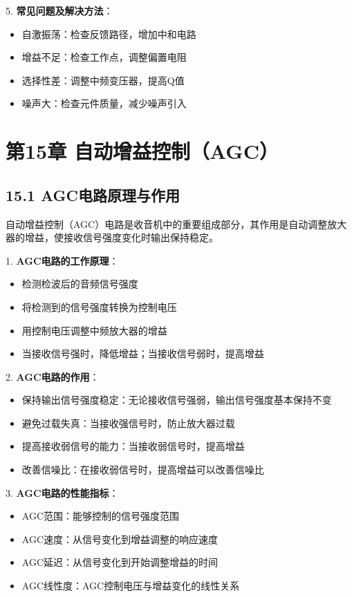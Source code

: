\documentclass[12pt,UTF8]{ctexbook}
\begin{document}
5. \textbf{常见问题及解决方法}：
   \begin{itemize}[leftmargin=3.5em]
   \item 自激振荡：检查反馈路径，增加中和电路
   \item 增益不足：检查工作点，调整偏置电阻
   \item 选择性差：调整中频变压器，提高Q值
   \item 噪声大：检查元件质量，减少噪声引入
   \end{itemize}

\chapter*{第15章 自动增益控制（AGC）}
\section*{15.1 AGC电路原理与作用}

自动增益控制（AGC）电路是收音机中的重要组成部分，其作用是自动调整放大器的增益，使接收信号强度变化时输出保持稳定。

1. \textbf{AGC电路的工作原理}：
   \begin{itemize}[leftmargin=3.5em]
   \item 检测检波后的音频信号强度
   \item 将检测到的信号强度转换为控制电压
   \item 用控制电压调整中频放大器的增益
   \item 当接收信号强时，降低增益；当接收信号弱时，提高增益
   \end{itemize}

2. \textbf{AGC电路的作用}：
   \begin{itemize}[leftmargin=3.5em]
   \item 保持输出信号强度稳定：无论接收信号强弱，输出信号强度基本保持不变
   \item 避免过载失真：当接收强信号时，防止放大器过载
   \item 提高接收弱信号的能力：当接收弱信号时，提高增益
   \item 改善信噪比：在接收弱信号时，提高增益可以改善信噪比
   \end{itemize}

3. \textbf{AGC电路的性能指标}：
   \begin{itemize}[leftmargin=3.5em]
   \item AGC范围：能够控制的信号强度范围
   \item AGC速度：从信号变化到增益调整的响应速度
   \item AGC延迟：从信号变化到开始调整增益的时间
   \item AGC线性度：AGC控制电压与增益变化的线性关系
   \end{itemize}
\end{document}
